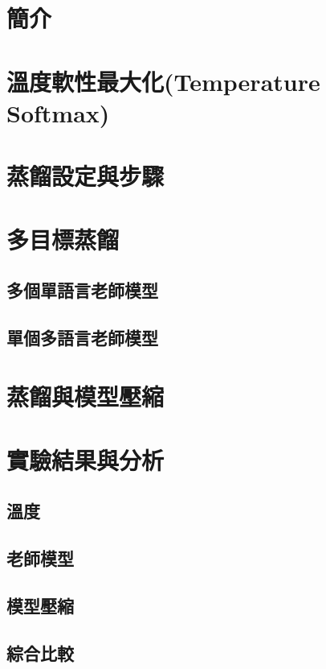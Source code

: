 \section{簡介}
\section{溫度軟性最大化(Temperature Softmax)}
\section{蒸餾設定與步驟}
\section{多目標蒸餾}
\subsection{多個單語言老師模型}
\subsection{單個多語言老師模型}
\section{蒸餾與模型壓縮}
\section{實驗結果與分析}
\subsection{溫度}
\subsection{老師模型}
\subsection{模型壓縮}
\subsection{綜合比較}    

